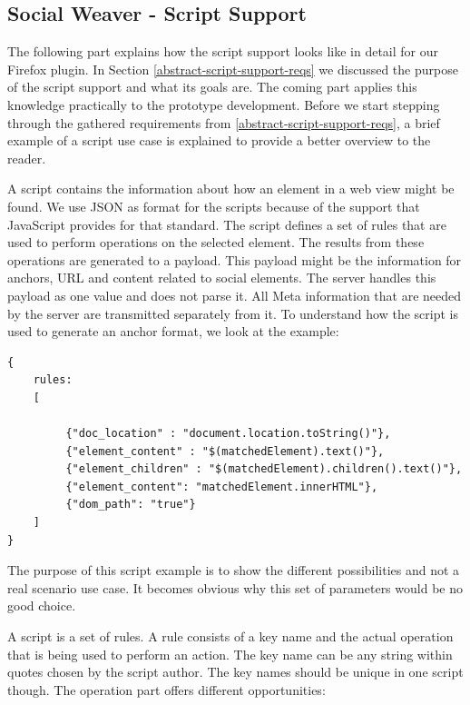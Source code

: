 \newpage
\subsection{Social Weaver - Script Support}\label{sowe-script-support}
The following part explains how the script support looks like in detail for our Firefox plugin. In Section \ref{abstract-script-support-reqs} we discussed the purpose of the script support and what its goals are. The coming part applies this knowledge practically to the prototype development. Before we start stepping through the gathered requirements from \ref{abstract-script-support-reqs}, a brief example of a script use case is explained to provide a better overview to the reader.

A script contains the information about how an element in a web view might be found. We use JSON as format for the scripts because of the support that JavaScript provides for that standard. The script defines a set of rules that are used to perform operations on the selected element. The results from these operations are generated to a payload. This payload might be the information for anchors, URL and content related to social elements. The server handles this payload as one value and does not parse it. All Meta information that are needed by the server are transmitted separately from it. To understand how the script is used to generate an anchor format, we look at the example:

\begin{lstlisting}
{
    rules:
    [

         {"doc_location" : "document.location.toString()"},
         {"element_content" : "$(matchedElement).text()"},
         {"element_children" : "$(matchedElement).children().text()"},
         {"element_content": "matchedElement.innerHTML"},
         {"dom_path": "true"}	
    ]
}
\end{lstlisting}

The purpose of this script example is to show the different possibilities and not a real scenario use case. It becomes obvious why this set of parameters would be no good choice. 

A script is a set of rules. A rule consists of a key name and the actual operation that is being used to perform an action. The key name can be any string within quotes chosen by the script author. The key names should be unique in one script though. The operation part offers different opportunities:

